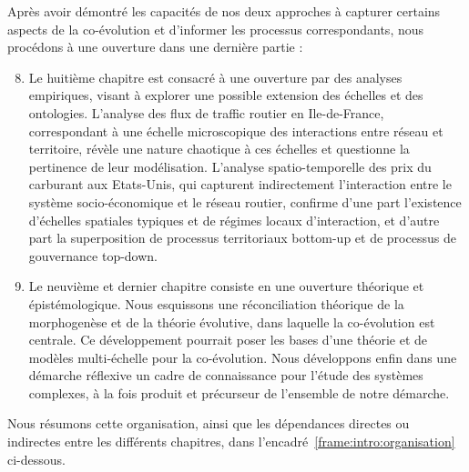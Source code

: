 {\begin{enumerate}
\end{enumerate}
Après avoir démontré les capacités de nos deux approches à capturer certains aspects de la co-évolution et d'informer les processus correspondants, nous procédons à une ouverture dans une dernière partie :
\begin{enumerate}\setcounter{enumi}{7}
	\item Le huitième chapitre est consacré à une ouverture par des analyses empiriques, visant à explorer une possible extension des échelles et des ontologies. L'analyse des flux de traffic routier en Ile-de-France, correspondant à une échelle microscopique des interactions entre réseau et territoire, révèle une nature chaotique à ces échelles et questionne la pertinence de leur modélisation. L'analyse spatio-temporelle des prix du carburant aux Etats-Unis, qui capturent indirectement l'interaction entre le système socio-économique et le réseau routier, confirme d'une part l'existence d'échelles spatiales typiques et de régimes locaux d'interaction, et d'autre part la superposition de processus territoriaux bottom-up et de processus de gouvernance top-down.
	\item Le neuvième et dernier chapitre consiste en une ouverture théorique et épistémologique. Nous esquissons une réconciliation théorique de la morphogenèse et de la théorie évolutive, dans laquelle la co-évolution est centrale. Ce développement pourrait poser les bases d'une théorie et de modèles multi-échelle pour la co-évolution. Nous développons enfin dans une démarche réflexive un cadre de connaissance pour l'étude des systèmes complexes, à la fois produit et précurseur de l'ensemble de notre démarche.
\end{enumerate}
}



Nous résumons cette organisation, ainsi que les dépendances directes ou indirectes entre les différents chapitres, dans l'encadré~\ref{frame:intro:organisation} ci-dessous.


